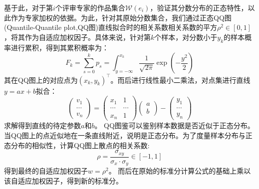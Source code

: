 \documentclass[bwprint]{gmcmthesis}
\begin{document}
	基于此，对于第$i$个评审专家的作品集合$\mathcal{W}(e_i)$，验证其分数分布的正态特性，以此作为专家加权的依据。为此，针对其原始分数集合，我们通过正态QQ图\cite{das2008qq}(Quantile-Quantile plot,QQ图)直线拟合\cite{weisstein2002least}时的相关系数相关系数的平方$\rho^2\in[0,1]$，将其作为自适应加权因子。具体来说，针对第$k$个样本，对分数小于$y_k$的样本概率进行累积，得到其累积概率为：
	\begin{equation}
		F_k=\sum_{s=0}^{k}p_s=\int_{y=-\infty}^{x_k}\frac{1}{\sqrt{2\pi}}\exp\left( -\frac{y^2}{2}\right) 
	\end{equation}
	其在QQ图上的对应点为$(x_k,y_k)^\top$。而后进行线性最小二乘法，对点集进行直线$y=ax+b$拟合：
	\begin{equation}
	\begin{pmatrix}
	v_1\\\cdots \\v_n
	\end{pmatrix}
	=\begin{pmatrix}
	x_1&1\\\cdots&\cdots\\x_n&1
	\end{pmatrix}
	\begin{pmatrix}
	a\\b
	\end{pmatrix}-\begin{pmatrix}
	y_1\\\cdots \\y_n
	\end{pmatrix}
	\end{equation}
	求解得到直线的待定参数$a$和$b$。
	QQ图鉴可以鉴别样本数据是否近似于正态分布。当QQ图上的点近似地在一条直线附近，说明是正态分布。为了度量样本分布与正态分布的相似性，计算QQ图上散点的相关系数\cite{asuero2006correlation}:
	\begin{equation}
		\rho=\frac{\sigma_{xy}}{\sigma_x\cdot\sigma_y}\in[-1,1]
	\end{equation}
	得到最终的自适应加权因子$w=\rho^2$。
	而后在原始的标准分计算公式的基础上乘以该自适应加权因子，得到新的标准分。
	
	\subsubsection{}
	\par
	
\end{document}
